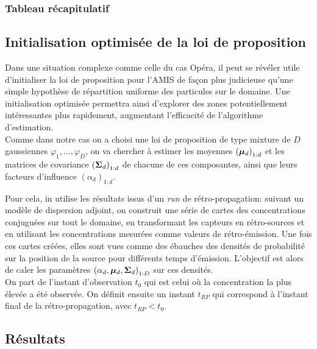 \subsubsection{Tableau récapitulatif}




\subsection{Initialisation optimisée de la loi de proposition}

Dans une situation complexe comme celle du cas Opéra, il peut se révéler utile d'initialiser la loi de proposition pour l'AMIS de façon plus judicieuse qu'une simple hypothèse de répartition uniforme des particules sur le domaine. Une initialisation optimisée permettra ainsi d'explorer des zones potentiellement intéressantes plus rapidement, augmentant l'efficacité de l'algorithme d'estimation. \\

Comme dans notre cas on a choisi une loi de proposition de type mixture de $D$ gaussiennes $\varphi_1, \dots, \varphi_D$, on va chercher à estimer les moyennes $\left({\bm{\mu}}_d\right)_{1:d}$ et les matrices de covariance $\left({\bm{\Sigma}}_d\right)_{1:d}$ de chacune de ces composantes, ainsi que leurs facteurs d'influence $\left(\alpha_d\right)_{1:d}$. 

Pour cela, in utilise les résultats issus d'un \textit{run} de rétro-propagation: suivant un modèle de dispersion adjoint, on construit une série de cartes des concentrations conjuguées sur tout le domaine, en transformant les capteurs en rétro-sources et en utilisant les concentrations mesurées comme valeurs de rétro-émission. Une fois ces cartes créées, elles sont vues comme des ébauches des densités de probabilité sur la position de la source pour différents temps d'émission. L'objectif est alors de caler les paramètres $\left(\alpha_d, {\bm{\mu}}_d,{\bm{\Sigma}}_d \right)_{1:D}$ sur ces densités.\\

On part de l'instant d'observation $t_0$ qui est celui où la concentration la plus élevée a été observée. On définit ensuite un instant $t_{RP}$ qui correspond à l'instant final de la rétro-propagation, avec $t_{RP} < t_0$. 

\subsection{Résultats}





